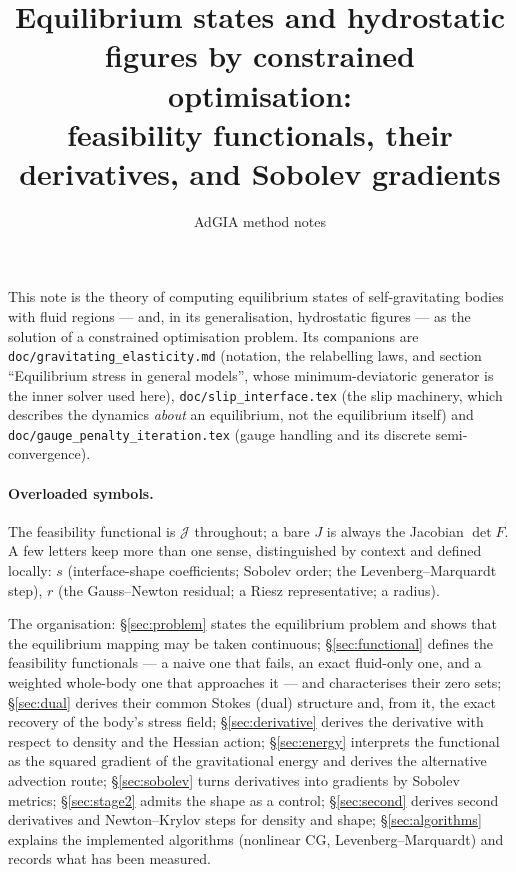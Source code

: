 \documentclass[11pt]{article}
\title{Equilibrium states and hydrostatic figures by constrained
       optimisation:\\ feasibility functionals, their derivatives,
       and Sobolev gradients}
\author{AdGIA method notes}
\date{}
\newcommand{\Jf}{\mathscr{J}}  %
\begin{document}
\maketitle
\sloppy

\noindent
This note is the theory of computing equilibrium states of
self-gravitating bodies with fluid regions --- and, in its
generalisation, hydrostatic figures --- as the solution of a
constrained optimisation problem. Its companions are
\texttt{doc/gravitating\_elasticity.md} (notation, the relabelling laws,
and section ``Equilibrium stress in general models'', whose
minimum-deviatoric generator is the inner solver used here),
\texttt{doc/slip\_interface.tex} (the slip machinery, which describes the
dynamics \emph{about} an equilibrium, not the equilibrium itself) and
\texttt{doc/gauge\_penalty\_iteration.tex} (gauge handling and its
discrete semi-convergence).

\paragraph{Overloaded symbols.} The feasibility functional is
$\Jf$ throughout; a bare $J$ is always the Jacobian $\det F$. A few
letters keep more than one sense, distinguished by context and defined
locally: $s$ (interface-shape coefficients; Sobolev order; the
Levenberg--Marquardt step), $r$ (the Gauss--Newton residual; a Riesz
representative; a radius).

The organisation: \S\ref{sec:problem} states the equilibrium problem and
shows that the equilibrium mapping may be taken continuous;
\S\ref{sec:functional} defines the feasibility functionals --- a naive
one that fails, an exact fluid-only one, and a weighted whole-body one
that approaches it --- and characterises their zero sets;
\S\ref{sec:dual} derives their common Stokes (dual) structure and, from
it, the exact recovery of the body's stress field;
\S\ref{sec:derivative} derives the derivative with respect to density
and the Hessian action; \S\ref{sec:energy} interprets the functional as
the squared gradient of the gravitational energy and derives the
alternative advection route; \S\ref{sec:sobolev} turns derivatives into
gradients by Sobolev metrics; \S\ref{sec:stage2} admits the shape as a
control; \S\ref{sec:second} derives second derivatives and
Newton--Krylov steps for density and shape; \S\ref{sec:algorithms}
explains the implemented algorithms (nonlinear CG, Levenberg--Marquardt)
and records what has been measured.
\end{document}
